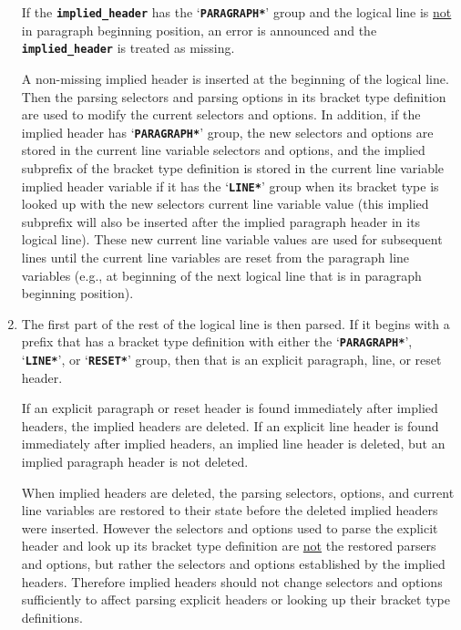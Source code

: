 \documentclass[12pt]{article}
\newcommand{\TT}[1]{{\tt \bfseries #1}}
\newcommand{\EOL}{\penalty \exhyphenpenalty}
\begin{document}
\begin{enumerate}
If the \TT{implied\_header} has the `\TT{*PARAGRAPH*}' group and the
logical line is \underline{not} in paragraph beginning position,
an error is announced and the \TT{implied\_\EOL header} is treated as missing.

A non-missing implied header is inserted at the beginning of the logical line.
Then the parsing selectors and parsing options
in its bracket type definition are used to
modify the current selectors and options.
In addition, if the implied header has `\TT{*PARAGRAPH*}' group,
the new selectors and options are stored in the current line
variable selectors and options, and
the implied subprefix of the bracket type definition is stored in
the current line variable implied header variable if it has the
`\TT{*LINE*}' group when its bracket type is looked up with the
new selectors current line variable value (this implied subprefix
will also be inserted after the implied paragraph header in its
logical line).
These new current line variable values are used for subsequent lines
until the current line variables are reset from the paragraph line
variables (e.g., at beginning of the next logical line that is
in paragraph beginning position).

\item\label{EXPLICIT-HEADER-PARSING}

The first part of the rest of the logical line is then parsed.
If it begins with a prefix that has a bracket type definition with either
the `\TT{*PARAGRAPH*}', `\TT{*LINE*}', or `\TT{*RESET*}' group,
then that is an explicit paragraph, line, or reset header.

If an explicit paragraph or reset
header is found immediately after implied headers,
the implied headers are deleted.
If an explicit line header is found immediately after implied headers,
an implied line header is deleted, but an implied paragraph header is not
deleted.

When implied headers are deleted, the parsing selectors, options,
and current line variables are restored to their state before the deleted
implied headers were inserted.
However the selectors and options used to parse the
explicit header and look up its
bracket type definition are \underline{not} the restored parsers and options,
but rather the selectors and options established by the implied headers.
Therefore implied headers should not change selectors and options
sufficiently to affect parsing explicit headers or looking up their
bracket type definitions.


\end{enumerate}
\end{document}
